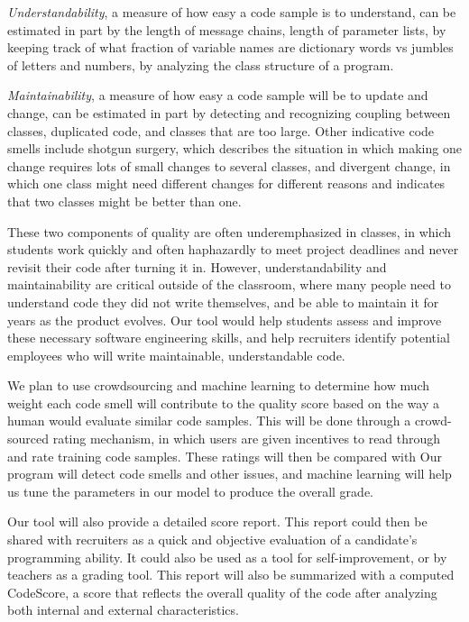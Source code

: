 \documentclass{sig-alternate}
\begin{document}
{\it Understandability}, a measure of how easy a code sample is to understand, can be estimated in part by the length of message chains, length of parameter lists, by keeping track of what fraction of variable names are dictionary words vs jumbles of letters and numbers, by analyzing the class structure of a program. 

{\it Maintainability}, a measure of how easy a code sample will be to update and change, can be estimated in part by detecting and recognizing coupling between classes, duplicated code, and classes that are too large. Other indicative code smells include shotgun surgery, which describes the situation in which making one change requires lots of small changes to several classes, and divergent change, in which one class might need different changes for different reasons and indicates that two classes might be better than one.

These two components of quality are often underemphasized in classes, in which students work quickly and often haphazardly to meet project deadlines and never revisit their code after turning it in. However, understandability and maintainability are critical outside of the classroom, where many people need to understand code they did not write themselves, and be able to maintain it for years as the product evolves. Our tool would help students assess and improve these necessary software engineering skills, and help recruiters identify potential employees who will write maintainable, understandable code.

We plan to use crowdsourcing and machine learning to determine how much weight each code smell will contribute to the quality score based on the way a human would evaluate similar code samples. This will be done through a crowd-sourced rating mechanism, in which users are given incentives to read through and rate training code samples. These ratings will then be compared with Our program will detect code smells and other issues, and machine learning will help us tune the parameters in our model to produce the overall grade. 

Our tool will also provide a detailed score report. This report could then be shared with recruiters as a quick and objective evaluation of a candidate's programming ability. It could also be used as a tool for self-improvement, or by teachers as a grading tool. This report will also be summarized with a computed CodeScore, a score that reflects the overall quality of the code after analyzing both internal and external characteristics.
\end{document}
